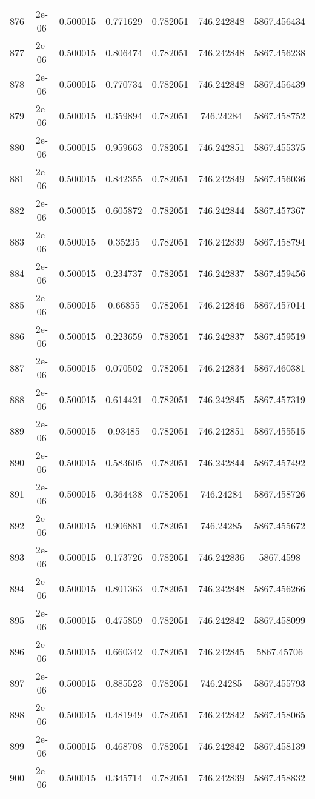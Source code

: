 \begin{table}
\begin{tabular*}{\linewidth}{c|c|c|c|c|c|c}
876 & 2e-06 & 0.500015 & 0.771629 & 0.782051 & 746.242848 & 5867.456434\\
877 & 2e-06 & 0.500015 & 0.806474 & 0.782051 & 746.242848 & 5867.456238\\
878 & 2e-06 & 0.500015 & 0.770734 & 0.782051 & 746.242848 & 5867.456439\\
879 & 2e-06 & 0.500015 & 0.359894 & 0.782051 & 746.24284 & 5867.458752\\
880 & 2e-06 & 0.500015 & 0.959663 & 0.782051 & 746.242851 & 5867.455375\\
881 & 2e-06 & 0.500015 & 0.842355 & 0.782051 & 746.242849 & 5867.456036\\
882 & 2e-06 & 0.500015 & 0.605872 & 0.782051 & 746.242844 & 5867.457367\\
883 & 2e-06 & 0.500015 & 0.35235 & 0.782051 & 746.242839 & 5867.458794\\
884 & 2e-06 & 0.500015 & 0.234737 & 0.782051 & 746.242837 & 5867.459456\\
885 & 2e-06 & 0.500015 & 0.66855 & 0.782051 & 746.242846 & 5867.457014\\
886 & 2e-06 & 0.500015 & 0.223659 & 0.782051 & 746.242837 & 5867.459519\\
887 & 2e-06 & 0.500015 & 0.070502 & 0.782051 & 746.242834 & 5867.460381\\
888 & 2e-06 & 0.500015 & 0.614421 & 0.782051 & 746.242845 & 5867.457319\\
889 & 2e-06 & 0.500015 & 0.93485 & 0.782051 & 746.242851 & 5867.455515\\
890 & 2e-06 & 0.500015 & 0.583605 & 0.782051 & 746.242844 & 5867.457492\\
891 & 2e-06 & 0.500015 & 0.364438 & 0.782051 & 746.24284 & 5867.458726\\
892 & 2e-06 & 0.500015 & 0.906881 & 0.782051 & 746.24285 & 5867.455672\\
893 & 2e-06 & 0.500015 & 0.173726 & 0.782051 & 746.242836 & 5867.4598\\
894 & 2e-06 & 0.500015 & 0.801363 & 0.782051 & 746.242848 & 5867.456266\\
895 & 2e-06 & 0.500015 & 0.475859 & 0.782051 & 746.242842 & 5867.458099\\
896 & 2e-06 & 0.500015 & 0.660342 & 0.782051 & 746.242845 & 5867.45706\\
897 & 2e-06 & 0.500015 & 0.885523 & 0.782051 & 746.24285 & 5867.455793\\
898 & 2e-06 & 0.500015 & 0.481949 & 0.782051 & 746.242842 & 5867.458065\\
899 & 2e-06 & 0.500015 & 0.468708 & 0.782051 & 746.242842 & 5867.458139\\
900 & 2e-06 & 0.500015 & 0.345714 & 0.782051 & 746.242839 & 5867.458832\\
\end{tabular*}
\end{table}
